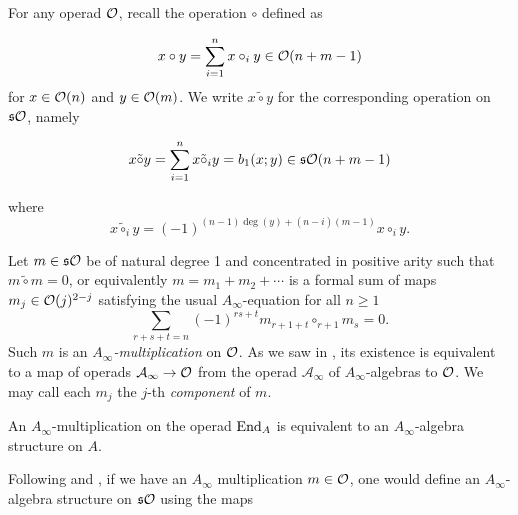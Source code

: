 \documentclass[Thesis.tex]{subfiles}
\begin{document}
For any operad ${\mathcal O}$, recall the operation $\circ$ defined as

\[
x\circ y=\sum_{i=1}^n x\circ_i y\in{\mathcal O}(n+m-1)
\]
for $x\in{\mathcal O}(n)$ and $y\in {\mathcal O}(m)$. We write $x\tilde{\circ}y$ for the corresponding operation on $\mathfrak{s}{\mathcal O}$, namely

\[
x\tilde{\circ} y=\sum_{i=1}^n x\tilde{\circ}_i y=b_1(x;y)\in\mathfrak{s}{\mathcal O}(n+m-1)
\]

where
\[x\tilde{\circ}_iy=(-1)^{(n-1)\deg(y)+(n-i)(m-1)}x\circ_i y.\]


\begin{defin}\label{ainftymultiplication}
Let $m\in\mathfrak{s}{\mathcal O}$ be of natural degree 1 and concentrated in positive arity such that $m\tilde{\circ}m=0$, or equivalently $m=m_1+m_2+\cdots$ is a formal sum of maps $m_j\in{\mathcal O}(j)^{2-j}$ satisfying the usual $A_\infty$-equation for all $n\geq 1$
\begin{equation}\label{Ainftyeq}
\sum_{r+s+t=n}(-1)^{rs+t}m_{r+1+t}\circ_{r+1}m_s=0.
\end{equation} 
Such $m$ is an \emph{$A_\infty$-multiplication} on ${\mathcal O}$. As we saw in , its existence is equivalent to a map of operads $\mathcal{A}_\infty\to {\mathcal O}$ from the operad $\mathcal{A}_\infty$ of $A_\infty$-algebras to ${\mathcal O}$. We may call each $m_j$ the $j$-th \emph{component} of $m$.
\end{defin}

\begin{remark}\label{multiplicationalgebra}
An $A_\infty$-multiplication on the operad $\operatorname{End}_A$ is equivalent to an $A_\infty$-algebra structure on $A$.
\end{remark}

Following \cite{GV} and \cite{getzler}, if we have an $A_\infty$ multiplication $m\in{\mathcal O}$, one would define an $A_\infty$-algebra structure on $\mathfrak{s}{\mathcal O}$ using the maps 
\end{document}
